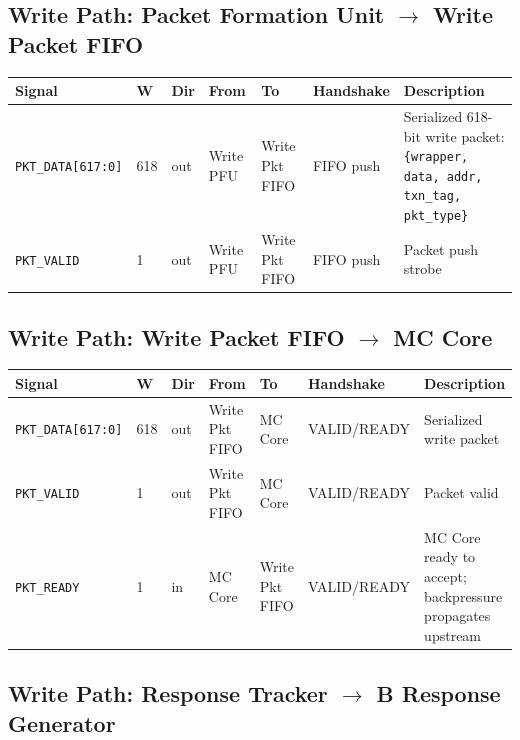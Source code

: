 \documentclass[11pt,a4paper]{article}
\begin{document}
\subsection{Write Path: Packet Formation Unit $\rightarrow$ Write Packet FIFO}

\begin{tabularx}{\textwidth}{L{3.0cm} C{0.8cm} C{1.0cm} L{2.2cm} L{2.2cm} L{2.0cm} X}
\toprule
\textbf{Signal} & \textbf{W} & \textbf{Dir} & \textbf{From} & \textbf{To} & \textbf{Handshake} & \textbf{Description} \\
\midrule
\texttt{PKT\_DATA[617:0]} & 618 & out & Write PFU & Write Pkt FIFO & FIFO push & Serialized 618-bit write packet: \texttt{\{wrapper, data, addr, txn\_tag, pkt\_type\}} \\
\texttt{PKT\_VALID}       & 1   & out & Write PFU & Write Pkt FIFO & FIFO push & Packet push strobe \\
\bottomrule
\end{tabularx}

\subsection{Write Path: Write Packet FIFO $\rightarrow$ MC Core}

\begin{tabularx}{\textwidth}{L{3.0cm} C{0.8cm} C{1.0cm} L{2.2cm} L{2.2cm} L{2.0cm} X}
\toprule
\textbf{Signal} & \textbf{W} & \textbf{Dir} & \textbf{From} & \textbf{To} & \textbf{Handshake} & \textbf{Description} \\
\midrule
\texttt{PKT\_DATA[617:0]} & 618 & out & Write Pkt FIFO & MC Core & VALID/READY & Serialized write packet \\
\texttt{PKT\_VALID}       & 1   & out & Write Pkt FIFO & MC Core & VALID/READY & Packet valid \\
\texttt{PKT\_READY}       & 1   & in  & MC Core        & Write Pkt FIFO & VALID/READY & MC Core ready to accept; backpressure propagates upstream \\
\bottomrule
\end{tabularx}

\subsection{Write Path: Response Tracker $\rightarrow$ B Response Generator}
\end{document}
